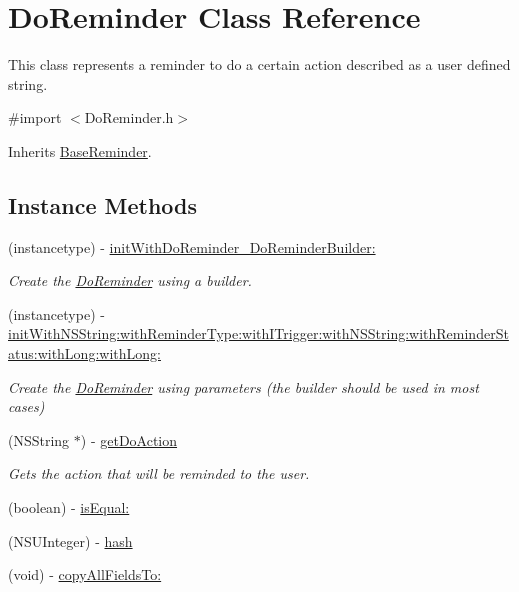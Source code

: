 \hypertarget{interface_do_reminder}{}\section{Do\+Reminder Class Reference}
\label{interface_do_reminder}


This class represents a reminder to do a certain action described as a user defined string.  




{\ttfamily \#import $<$Do\+Reminder.\+h$>$}



Inherits \hyperlink{interface_base_reminder}{Base\+Reminder}.

\subsection*{Instance Methods}
\begin{DoxyCompactItemize}
\item 
(instancetype) -\/ \hyperlink{interface_do_reminder_a00f7c6f1976c59af230c871b8f5a2f16}{init\+With\+Do\+Reminder\+\_\+\+Do\+Reminder\+Builder\+:}
\begin{DoxyCompactList}\small\item\em Create the \hyperlink{interface_do_reminder}{Do\+Reminder} using a builder. \end{DoxyCompactList}\item 
(instancetype) -\/ \hyperlink{interface_do_reminder_adf66930578abcecdef9ebab078c4d4a2}{init\+With\+N\+S\+String\+:with\+Reminder\+Type\+:with\+I\+Trigger\+:with\+N\+S\+String\+:with\+Reminder\+Status\+:with\+Long\+:with\+Long\+:}
\begin{DoxyCompactList}\small\item\em Create the \hyperlink{interface_do_reminder}{Do\+Reminder} using parameters (the builder should be used in most cases) \end{DoxyCompactList}\item 
(N\+S\+String $\ast$) -\/ \hyperlink{interface_do_reminder_a5de3176bd863676e5be29c272d2249e4}{get\+Do\+Action}
\begin{DoxyCompactList}\small\item\em Gets the action that will be reminded to the user. \end{DoxyCompactList}\item 
(boolean) -\/ \hyperlink{interface_do_reminder_afb8f30410b2b006cef9e16401b5ff66e}{is\+Equal\+:}
\item 
(N\+S\+U\+Integer) -\/ \hyperlink{interface_do_reminder_a84e247ea01392383b0a61fd35e005fb3}{hash}
\item 
(void) -\/ \hyperlink{interface_do_reminder_ac8bc7f2080c941473e7fd9f33f60cd9c}{copy\+All\+Fields\+To\+:}
\end{DoxyCompactItemize}
